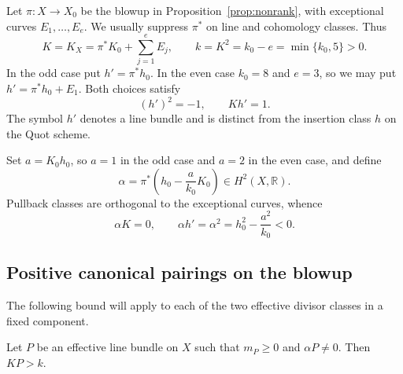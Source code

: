 Let $\pi:X\to X_0$ be the blowup in Proposition~\ref{prop:nonrank},
with exceptional curves $E_1,\ldots,E_e$.  We usually suppress $\pi^*$
on line and cohomology classes.  Thus
\[
 K=K_X=\pi^*K_0+\sum_{j=1}^e E_j,
 \qquad k=K^2=k_0-e=\min\{k_0,5\}>0.
\]
In the odd case put $h'=\pi^*h_0$.  In the even case $k_0=8$ and
$e=3$, so we may put $h'=\pi^*h_0+E_1$.  Both choices satisfy
\begin{equation}\label{nr:h-prime}
 (h')^2=-1,\qquad Kh'=1.
\end{equation}
The symbol $h'$ denotes a line bundle and is distinct from the insertion
class $h$ on the Quot scheme.

Set $a=K_0h_0$, so $a=1$ in the odd case and $a=2$ in the even case,
and define
\begin{equation}\label{nr:alpha}
 \alpha=\pi^*\!\left(h_0-\frac{a}{k_0}K_0\right)
       \in H^2(X,\mathbb R).
\end{equation}
Pullback classes are orthogonal to the exceptional curves, whence
\begin{equation}\label{nr:alpha-identities}
 \alpha K=0,\qquad
 \alpha h'=\alpha^2=h_0^2-\frac{a^2}{k_0}<0.
\end{equation}

\subsection{Positive canonical pairings on the blowup}

The following bound will apply to each of the two effective divisor
classes in a fixed component.

\begin{lemma}\label{nr:positive-pairing}
Let $P$ be an effective line bundle on $X$ such that $m_P\geq0$ and
$\alpha P\ne0$.  Then $KP>k$.
\end{lemma}

